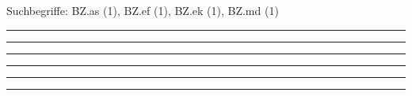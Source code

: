 \documentclass[a4paper,12pt]{report}
\begin{document}

 \scriptsize Suchbegriffe: BZ.as (1), BZ.ef (1), BZ.ek (1), BZ.md (1)\normalsize 
 
%
\hrule	 \leer

%
\hrule	 \leer

%
\hrule	 \leer

%
\hrule	 \leer

%
\hrule	 \leer

%
\hrule	 \leer

\end{document}
